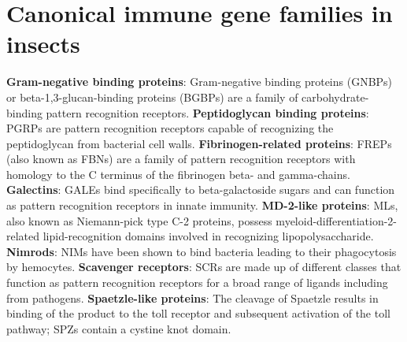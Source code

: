 \documentclass[11pt]{article}
\begin{document}
\section{Canonical immune gene families in insects}
\label{Supplement}
\textbf{Gram-negative binding proteins}: Gram-negative binding proteins (GNBPs) or beta-1,3-glucan-­binding proteins (BGBPs) are a family of carbohydrate-binding pattern recognition receptors.
\newline
\textbf{Peptidoglycan binding proteins}: PGRPs are pattern recognition receptors capable of recognizing
the peptidoglycan from bacterial cell walls.
\newline
\textbf{Fibrinogen-related proteins}: FREPs (also known as FBNs) are a family of pattern recognition
receptors with homology to the C terminus of the fibrinogen beta- and gamma-chains.
\newline
\textbf{Galectins}: GALEs bind specifically to beta-galactoside sugars and can function as pattern recognition receptors in innate immunity.
\newline
\textbf{MD-2-like proteins}: MLs, also known as Niemann-pick type C-2 proteins, possess myeloid-differentiation-­2-related lipid-­recognition domains involved in recognizing lipopolysaccharide.
\newline
\textbf{Nimrods}: NIMs have been shown to bind bacteria leading to their phagocytosis by hemocytes.
\newline
\textbf{Scavenger receptors}: SCRs are made up of different classes that function as pattern recognition receptors for a broad range of ligands including from pathogens.
\newline
\textbf{Spaetzle-like proteins}: The cleavage of Spaetzle results in binding of the product to the
toll receptor and subsequent activation of the toll pathway; SPZs contain a cystine knot domain.
\newline
\end{document}

